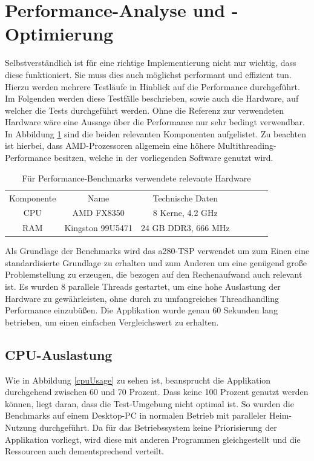 \section{Performance-Analyse und -Optimierung}
Selbstverständlich ist für eine richtige Implementierung nicht nur wichtig, dass diese funktioniert. Sie muss dies auch möglichst performant und effizient tun. Hierzu werden mehrere Testläufe in Hinblick auf die Performance durchgeführt. Im Folgenden werden diese Testfälle beschrieben, sowie auch die Hardware, auf welcher die Tests durchgeführt werden. Ohne die Referenz zur verwendeten Hardware wäre eine Aussage über die Performance nur sehr bedingt verwendbar. In Abbildung \ref{hardware} sind die beiden relevanten Komponenten aufgelistet. Zu beachten ist hierbei, dass AMD-Prozessoren allgemein eine höhere Multithreading-Performance besitzen, welche in der vorliegenden Software genutzt wird.

\begin{table}[H]
	\centering
	\begin{tabular}{c c c c c c c}
		Komponente & Name & Technische Daten\\
		CPU & AMD FX8350 & 8 Kerne, 4.2 GHz\\ 
		RAM & Kingston 99U5471 & 24 GB DDR3, 666 MHz  \\ 
	\end{tabular}
	\caption{Für Performance-Benchmarks verwendete relevante Hardware}
	\label{hardware}
\end{table}

Als Grundlage der Benchmarks wird das a280-\ac{TSP} verwendet um zum Einen eine standardisierte Grundlage zu erhalten und zum Anderen um eine genügend große Problemstellung zu erzeugen, die bezogen auf den Rechenaufwand auch relevant ist. Es wurden 8 parallele Threads gestartet, um eine hohe Auslastung der Hardware zu gewährleisten, ohne durch zu umfangreiches Threadhandling Performance einzubüßen. Die Applikation wurde genau 60 Sekunden lang betrieben, um einen einfachen Vergleichswert zu erhalten.

\subsection{CPU-Auslastung}
Wie in Abbildung \ref{cpuUsage} zu sehen ist, beansprucht die Applikation durchgehend zwischen 60 und 70 Prozent. Dass keine 100 Prozent genutzt werden können, liegt daran, dass die Test-Umgebung nicht optimal ist. So wurden die Benchmarks auf einem Desktop-PC in normalen Betrieb mit paralleler Heim-Nutzung durchgeführt. Da für das Betriebssystem keine Priorisierung der Applikation vorliegt, wird diese mit anderen Programmen gleichgestellt und die Ressourcen auch dementsprechend verteilt.

